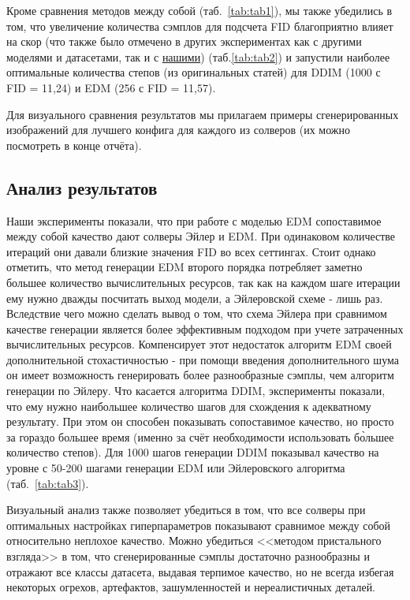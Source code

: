 \documentclass[a4paper]{article}
\begin{document}
    Кроме сравнения методов между собой (таб.~\ref{tab:tab1}), мы также убедились в том, что увеличение количества сэмплов для подсчета FID благоприятно влияет на скор (что также было отмечено в других экспериментах как с другими моделями и датасетами, так и с \href{https://github.com/yuanzhi-zhu/mini_edm}{нашими}) (таб.\ref{tab:tab2}) и запустили наиболее оптимальные количества степов (из оригинальных статей) для DDIM (1000 с FID = 11{,}24) и EDM (256 с FID = 11{,}57).
    \par Для визуального сравнения результатов мы прилагаем примеры сгенерированных изображений для лучшего конфига для каждого из солверов (их можно посмотреть в конце отчёта).
    
    \subsection{Анализ результатов}
    Наши эксперименты показали, что при работе с моделью EDM сопоставимое между собой качество дают солверы Эйлер и EDM. При одинаковом количестве итераций они давали близкие значения FID во всех сеттингах. Стоит однако отметить, что метод генерации EDM второго порядка потребляет заметно большее количество вычислительных ресурсов, так как на каждом шаге итерации ему нужно дважды посчитать выход модели, а Эйлеровской схеме - лишь раз. Вследствие чего можно сделать вывод о том, что схема Эйлера при сравнимом качестве генерации является более эффективным подходом при учете затраченных вычислительных ресурсов. Компенсирует этот недостаток алгоритм EDM своей дополнительной стохастичностью - при помощи введения дополнительного шума он имеет возможность генерировать более разнообразные сэмплы, чем алгоритм генерации по Эйлеру.
    Что касается алгоритма DDIM, эксперименты показали, что ему нужно наибольшее количество шагов для схождения к адекватному результату. При этом он способен показывать сопоставимое качество, но просто за гораздо большее время (именно за счёт необходимости использовать б\`{о}льшее количество степов). Для 1000 шагов генерации DDIM показывал качество на уровне с 50-200 шагами генерации EDM или Эйлеровского алгоритма (таб.~\ref{tab:tab3}).
    \par Визуальный анализ также позволяет убедиться в том, что все солверы при оптимальных настройках гиперпараметров показывают сравнимое между собой относительно неплохое качество. Можно убедиться <<методом пристального взгляда>> в том, что сгенерированные сэмплы достаточно разнообразны и отражают все классы датасета, выдавая терпимое качество, но не всегда избегая некоторых огрехов, артефактов, зашумленностей и нереалистичных деталей.
    
\end{document}
